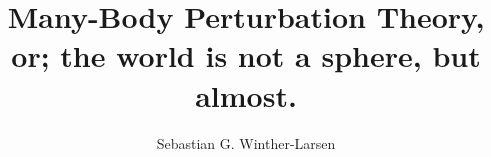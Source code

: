 \documentclass{beamer}
\title{Many-Body Perturbation Theory, \\
		\large{or; the world is not a sphere, but almost.}}
\author{Sebastian G. Winther-Larsen}
\begin{document}
\begin{frame}
	\titlepage
\end{frame}

\begin{frame}
	
\end{frame}
\end{document}
